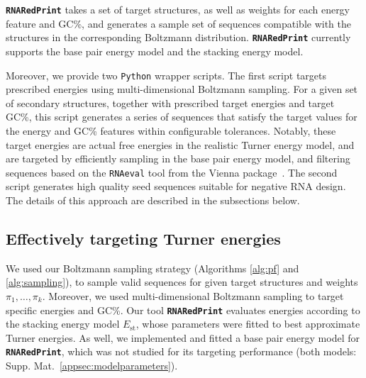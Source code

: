 \documentclass[twocolumn]{bmcart}%
\newcommand{\Nuc}[1]{{\sf #1}}
\newcommand{\Cb}{\Nuc{C}}
\newcommand{\Gb}{\Nuc{G}}
\newcommand{\GCb}{\Gb\Cb}
\newcommand{\ourprog}{{\tt \bfseries{}\color{black!85}RNA\textcolor{red!70!black}{Red}Print}}
\newcommand{\EnergyStacking}{E_{\text{st}}}
\begin{document}
\ourprog{}  takes a set of target structures, as well as
weights for each energy feature and \GCb\%, and generates a sample set of sequences compatible with the structures in the corresponding
Boltzmann distribution. \ourprog{} currently supports the base pair
energy model and the stacking energy model.

Moreover, we provide two {\tt Python} wrapper scripts. The first script targets prescribed energies using multi-dimensional Boltzmann sampling.
For a given set of secondary structures, together with prescribed target energies
and target \GCb\%, this script generates a series of sequences that satisfy the target values for the energy and
\GCb\% features within configurable tolerances.
Notably, these target energies are actual free energies in the realistic
Turner energy model, and are targeted by efficiently sampling in the
base pair energy model, and filtering sequences based on the {\tt RNAeval} tool from the Vienna package~\cite{Lorenz2011}. The second script generates high quality seed sequences suitable for negative RNA design. The details of this approach are described in the subsections below.


\subsection*{Effectively targeting Turner energies}
We used our Boltzmann sampling strategy (Algorithms
\ref{alg:pf} and \ref{alg:sampling}), to sample valid sequences for
given target structures and weights $\pi_1,\dots,\pi_k$.  Moreover, we
used multi-dimensional Boltzmann sampling to target specific energies and
\GCb\%.  Our tool \ourprog{} evaluates energies according to the
stacking energy model $\EnergyStacking$, whose parameters were fitted
to best approximate Turner energies. As well, we implemented and
fitted a base pair energy model for \ourprog{}, which was not studied
for its targeting performance (both models:
Supp. Mat.~\ref{appsec:modelparameters}).
%
%
\end{document}
